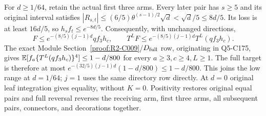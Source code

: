 For $d\ge1/64$, retain the actual first three arms.
Every later pair has $s\ge5$ and its original interval satisfies
$|R_{s,t}|\le(6/5)\theta^{(s-1)/2}\sqrt d
<\sqrt d/5\le8d/5$.
Its loss is at least $16d/5$, so $h_sf_t\le e^{-8d/5}$.
Consequently, with unchanged directions,
\[
F\le e^{-(8/5)(j-1)d}qf_3h_c,\qquad
T^LF\le e^{-(8/5)(j-1)d}T^L(qf_3h_c).
\]
The exact Module Section~\ref{proof:R2-C009}/$D_{\rm full}$ row, originating in Q5-C175,
gives $\mathbb E[f_a\{T^L(qf_3h_c)\}^4]\le1-d/800$ for every
$a\ge3,c\ge4,L\ge1$.
The full target is therefore at most
$e^{-(32/5)(j-1)d}(1-d/800)\le1-d/800$.
This joins the low range at $d=1/64$; $j=1$ uses the same directory
row directly. At $d=0$ original leaf integration gives equality,
without $K=0$. Positivity restores original equal pairs and full
reversal reverses the receiving arm, first three arms, all subsequent
pairs, connectors, and decorations together.
